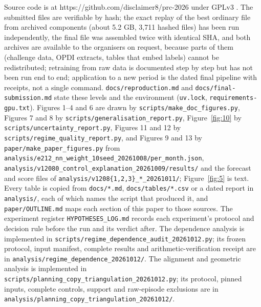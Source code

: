 \documentclass[
  manuscript=article,  %
  layout=preprint,     %
  year=2026,
  volume=4,
]{extra/joas}
\begin{document}
Source code is at https://github.com/disclaimer8/prc-2026 under GPLv3 \autocite{kolomiiets2026repo}. The submitted files are verifiable by hash; the exact replay of the best ordinary file from archived components (about 5.2 GB, 3,711 hashed files) has been run independently, the final file was assembled twice with identical SHA, and both archives are available to the organisers on request, because parts of them (challenge data, OPDI extracts, tables that embed labels) cannot be redistributed; retraining from raw data is documented step by step but has not been run end to end; application to a new period is the dated final pipeline with receipts, not a single command. \texttt{docs/\allowbreak{}reproduction.md} and \texttt{docs/\allowbreak{}final-submission.md} state these levels and the environment (\texttt{uv.lock}, \texttt{requirements-gpu.txt}). Figures 1--4 and 6 are drawn by \texttt{scripts/\allowbreak{}make\_\allowbreak{}doc\_\allowbreak{}figures.py}, Figures 7 and 8 by \texttt{scripts/\allowbreak{}generalisation\_\allowbreak{}report.py}, Figure~\ref{fig:10} by \texttt{scripts/\allowbreak{}uncertainty\_\allowbreak{}report.py}, Figures 11 and 12 by \texttt{scripts/\allowbreak{}regime\_\allowbreak{}quality\_\allowbreak{}report.py}, and Figures 9 and 13 by \texttt{paper/\allowbreak{}make\_\allowbreak{}paper\_\allowbreak{}figures.py} from \texttt{analysis/\allowbreak{}e212\_\allowbreak{}nn\_\allowbreak{}weight\_\allowbreak{}10seed\_\allowbreak{}20261008/\allowbreak{}per\_\allowbreak{}month.json}, \texttt{analysis/\allowbreak{}v12080\_\allowbreak{}control\_\allowbreak{}explanation\_\allowbreak{}20261009/\allowbreak{}results/\allowbreak{}} and the forecast and score files of \texttt{analysis/v1208\{1,2,3\}\_*\_20261011/}; Figure~\ref{fig:5} is text. Every table is copied from \texttt{docs/\allowbreak{}*.md}, \texttt{docs/\allowbreak{}tables/\allowbreak{}*.csv} or a dated report in \texttt{analysis/\allowbreak{}}, each of which names the script that produced it, and \texttt{paper/\allowbreak{}OUTLINE.md} maps each section of this paper to those sources. The experiment register \texttt{HYPOTHESES\_\allowbreak{}LOG.md} records each experiment's protocol and decision rule before the run and its verdict after. The dependence analysis is implemented in \texttt{scripts/\allowbreak{}regime\_\allowbreak{}dependence\_\allowbreak{}audit\_\allowbreak{}20261012.py}; its frozen protocol, input manifest, complete results and arithmetic-verification receipt are in \texttt{analysis/\allowbreak{}regime\_\allowbreak{}dependence\_\allowbreak{}20261012/\allowbreak{}}. The alignment and geometric analysis is implemented in \texttt{scripts/\allowbreak{}planning\_\allowbreak{}copy\_\allowbreak{}triangulation\_\allowbreak{}20261012.py}; its protocol, pinned inputs, complete controls, support and raw-episode exclusions are in \texttt{analysis/\allowbreak{}planning\_\allowbreak{}copy\_\allowbreak{}triangulation\_\allowbreak{}20261012/\allowbreak{}}.
\end{document}
